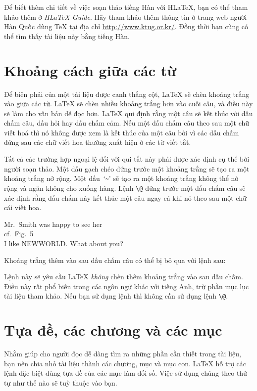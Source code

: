 Để biết thêm chi tiết về việc soạn thảo tiếng Hàn với H\LaTeX{},
bạn có thể tham khảo thêm ở \emph{H\LaTeX{} Guide}. Hãy tham khảo
thêm thông tin ở trang web người Hàn Quốc dùng TeX{} tại địa chỉ
\url{http://www.ktug.or.kr/}. Đồng thời bạn cũng có thể tìm thấy
tài liệu này bằng tiếng Hàn.

\section{Khoảng cách giữa các từ}
Để biên phải của một tài liệu được canh thẳng cột, \LaTeX{} sẽ chèn khoảng trắng vào giữa các từ. \LaTeX{} sẽ chèn nhiều khoảng trắng hơn vào cuối câu, và điều này sẽ làm cho văn bản dễ đọc hơn. \LaTeX{} qui định rằng một câu sẽ kết thúc với dấu chấm câu, dấu hỏi hay dấu chấm cảm. Nếu một dấu chấm câu theo sau một chữ viết hoá thì nó không được xem là kết
thúc của một câu bởi vì các dấu chấm đứng sau các chữ viết hoa thường xuất hiện ở các từ viết tắt.

Tất cả các trường hợp ngoại lệ đối với qui tắt này phải được xác định cụ thể bởi người soạn thảo. Một dấu gạch chéo đứng trước một khoảng trắng sẽ tạo ra một khoảng trắng nở rộng. Một dấu~`\verb|~|' sẽ tạo ra một khoảng trắng không thể nở rộng và ngăn không cho xuống hàng. Lệnh \verb|\@| đứng trước một dấu chấm câu sẽ xác định rằng dấu chấm này kết thúc một câu ngay cả khi nó theo sau một chữ cái viết hoa.   
\begin{example}
Mr.~Smith was happy to see
her\\ cf.~Fig.~5\\
I like NEWWORLD\@.
What about you?
\end{example}

Khoảng trắng thêm vào sau dấu chấm câu có thể bị bỏ qua với lệnh sau:
\begin{lscommand}
\end{lscommand}
\noindent Lệnh này sẽ yêu cầu \LaTeX{} \emph{không} chèn thêm khoảng trắng vào sau dấu chấm. Điều này rất phổ biến trong các ngôn ngữ khác với tiếng Anh, trừ phần mục lục tài liệu tham khảo. Nếu bạn sử dụng lệnh  thì không cần sử dụng lệnh \verb|\@|.

\section{Tựa đề, các chương và các mục}
Nhằm giúp cho người đọc dễ dàng tìm ra những phần cần thiết trong tài liệu, bạn nên chia nhỏ tài liệu thành các chương, mục và mục con. \LaTeX{} hỗ trợ các lệnh đặc biệt dùng tựa đề của các mục làm đối số. Việc sử dụng chúng theo thứ tự như thế nào sẽ tuỳ thuộc vào bạn.

